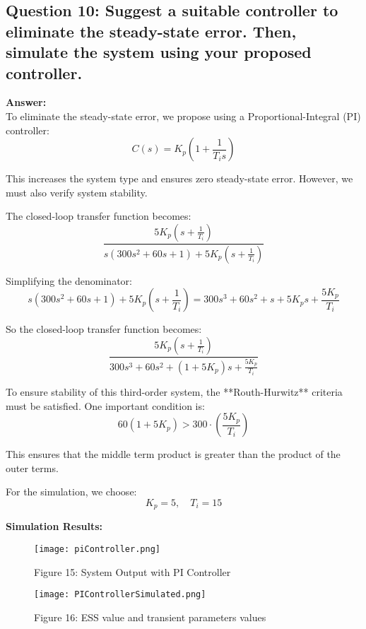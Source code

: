 \documentclass{report}
\begin{document}
\begin{flushleft}
\newpage
\section*{Question 10: Suggest a suitable controller to eliminate the steady-state error. Then, simulate the system using your proposed controller.}

\textbf{Answer:} \\

To eliminate the steady-state error, we propose using a Proportional-Integral (PI) controller:
\[
C(s) = K_p \left(1 + \frac{1}{T_i s} \right)
\]

This increases the system type and ensures zero steady-state error. However, we must also verify system stability.

The closed-loop transfer function becomes:
\[
\frac{5K_p(s + \frac{1}{T_i})}{s(300s^2 + 60s + 1) + 5K_p(s + \frac{1}{T_i})}
\]

Simplifying the denominator:
\[
s(300s^2 + 60s + 1) + 5K_p\left(s + \frac{1}{T_i}\right) = 300s^3 + 60s^2 + s + 5K_p s + \frac{5K_p}{T_i}
\]

So the closed-loop transfer function becomes:
\[
\frac{5K_p(s + \frac{1}{T_i})}{300s^3 + 60s^2 + (1 + 5K_p)s + \frac{5K_p}{T_i}}
\]

To ensure stability of this third-order system, the **Routh-Hurwitz** criteria must be satisfied. One important condition is:
\[
60(1 + 5K_p) > 300 \cdot \left(\frac{5K_p}{T_i}\right)
\]

This ensures that the middle term product is greater than the product of the outer terms.

For the simulation, we choose:
\[
K_p = 5, \quad T_i = 15
\]

\textbf{Simulation Results:}

\vspace{0.5em}

\begin{figure}[h!]
\centering
\begin{minipage}{0.48\textwidth}
  \centering
  \texttt{[image: piController.png]}
  \caption*{Figure 15: System Output with PI Controller}
\end{minipage}\hfill
\begin{minipage}{0.48\textwidth}
  \centering
  \texttt{[image: PIControllerSimulated.png]}
  \caption*{Figure 16: ESS value and transient parameters values}
\end{minipage}
\end{figure}



\end{flushleft}
\end{document}
